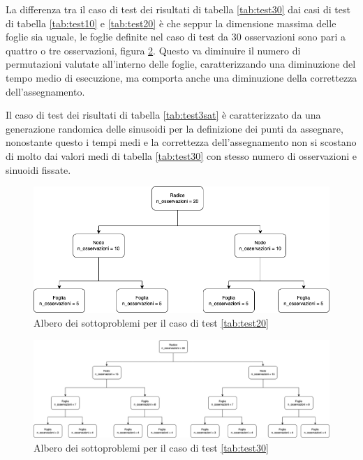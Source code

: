 \documentclass[a4paper,12pt]{report}
\begin{document}
La differenza tra il caso di test dei risultati di tabella \ref{tab:test30} dai casi di test di tabella \ref{tab:test10} e \ref{tab:test20} è che seppur la dimensione massima delle foglie sia uguale, le foglie definite nel caso di test da 30 osservazioni sono pari a quattro o tre osservazioni, figura \ref{fig:alberoTest30}. Questo va diminuire il numero di permutazioni valutate all'interno delle foglie, caratterizzando una diminuzione del tempo medio di esecuzione, ma comporta anche una diminuzione della correttezza dell'assegnamento.

Il caso di test dei risultati di tabella \ref{tab:test3sat} è caratterizzato da una generazione randomica delle sinusoidi per la definizione dei punti da assegnare, nonostante questo i tempi medi e la correttezza dell'assegnamento non si scostano di molto dai valori medi di tabella \ref{tab:test30} con stesso numero di osservazioni e sinuoidi fissate.

\begin{figure}[H]
  \centering
  \includegraphics[scale=0.50]{img/utility/alberoTest20.png}
  \caption{Albero dei sottoproblemi per il caso di test \ref{tab:test20}}
  \label{fig:alberoTest20}
\end{figure}

\begin{figure}[H]
  \centering
  \includegraphics[scale=0.5,angle=90,origin=c]{img/utility/alberoTest30.png}
  \caption{Albero dei sottoproblemi per il caso di test \ref{tab:test30}}
  \label{fig:alberoTest30}
\end{figure}
\end{document}
